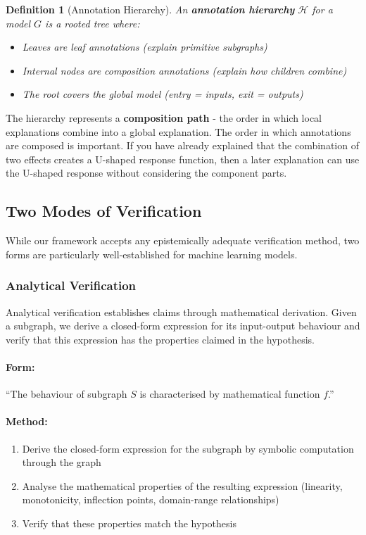 \documentclass{article}
\newtheorem{definition}{Definition}
\begin{document}
\begin{definition}[Annotation Hierarchy]
An \textbf{annotation hierarchy} $\mathcal{H}$ for a model $G$ is a rooted tree where:
\begin{itemize}
    \item Leaves are leaf annotations (explain primitive subgraphs)
    \item Internal nodes are composition annotations (explain how children combine)
    \item The root covers the global model (entry = inputs, exit = outputs)
\end{itemize}
\end{definition}

The hierarchy represents a \textbf{composition path} - the order in which local explanations combine into a global explanation. The order in which annotations are composed is important. If you have already explained that the combination of two effects creates a U-shaped response function, then a later explanation can use the U-shaped response without considering the component parts.


\subsection{Two Modes of Verification}

While our framework accepts any epistemically adequate verification method, two forms are particularly well-established for machine learning models.

\subsubsection{Analytical Verification}

Analytical verification establishes claims through mathematical derivation. Given a subgraph, we derive a closed-form expression for its input-output behaviour and verify that this expression has the properties claimed in the hypothesis.

\paragraph{Form:} ``The behaviour of subgraph $S$ is characterised by mathematical function $f$.''

\paragraph{Method:}
\begin{enumerate}
    \item Derive the closed-form expression for the subgraph by symbolic computation through the graph
    \item Analyse the mathematical properties of the resulting expression (linearity, monotonicity, inflection points, domain-range relationships)
    \item Verify that these properties match the hypothesis
\end{enumerate}
\end{document}
